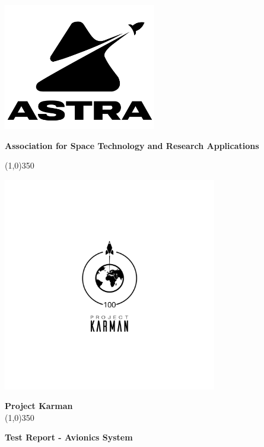 \documentclass[12pt,a4paper,numbers=endperiod]{article}
\begin{document}
\begin{titlepage}
	\begin{center}
	\includegraphics[width=0.5\textwidth]{Official_ASTRA_LOGO.png} \par \vspace{1cm}
	{\LARGE \bf Association for Space Technology and Research Applications }
	\par \vspace{0.5cm}	
	{\line(1,0){350}}
	\par \vspace{-1.5cm}
	\includegraphics[width=0.7\textwidth]{Project_Karman_Logo.png}
	\par \vspace{-2cm}
	{\LARGE \bf Project Karman}\\
	\vspace{0.5cm}
	{\line(1,0){350}}
	\par \vspace{0.5cm}
	{\Large \bf Test Report - Avionics System}


	\end{center}
\end{titlepage}
\end{document}
